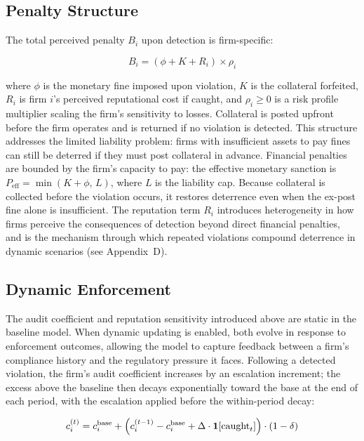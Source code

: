 \subsection{Penalty Structure}

The total perceived penalty $B_i$ upon detection is firm-specific:

\begin{equation}
B_i = (\phi + K + R_i) \times \rho_i
\label{eq:burden}
\end{equation}

where $\phi$ is the monetary fine imposed upon violation, $K$ is the collateral forfeited, $R_i$ is firm $i$'s perceived reputational cost if caught, and $\rho_i \geq 0$ is a risk profile multiplier scaling the firm's sensitivity to losses. Collateral is posted upfront before the firm operates and is returned if no violation is detected. This structure addresses the limited liability problem: firms with insufficient assets to pay fines can still be deterred if they must post collateral in advance. Financial penalties are bounded by the firm's capacity to pay: the effective monetary sanction is $P_{\mathrm{eff}} = \min(K + \phi,\, L)$, where $L$ is the liability cap. Because collateral is collected before the violation occurs, it restores deterrence even when the ex-post fine alone is insufficient. The reputation term $R_i$ introduces heterogeneity in how firms perceive the consequences of detection beyond direct financial penalties, and is the mechanism through which repeated violations compound deterrence in dynamic scenarios (see Appendix~D).

\subsection{Dynamic Enforcement}
\label{sec:dynamics}

The audit coefficient and reputation sensitivity introduced above are static in the baseline model. When dynamic updating is enabled, both evolve in response to enforcement outcomes, allowing the model to capture feedback between a firm's compliance history and the regulatory pressure it faces. Following a detected violation, the firm's audit coefficient increases by an escalation increment; the excess above the baseline then decays exponentially toward the base at the end of each period, with the escalation applied before the within-period decay:

\begin{equation}
c_i^{(t)} = c_i^{\mathrm{base}} + \Bigl(c_i^{(t-1)} - c_i^{\mathrm{base}} + \Delta \cdot \mathbf{1}[\text{caught}_{t}]\Bigr)\cdot(1 - \delta)
\label{eq:coeff}
\end{equation}

